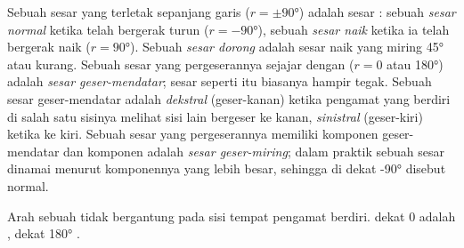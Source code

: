 \begin{definition}\label{def:b1:faults-folds-fabrics:fault-types}
Sebuah sesar yang  terletak sepanjang garis  ($r = \pm\ang{90}$) adalah sesar : sebuah \emph{sesar normal} ketika  telah bergerak turun ($r = \ang{-90}$), sebuah \emph{sesar naik} ketika ia telah bergerak naik ($r = \ang{90}$). Sebuah \emph{sesar dorong} adalah sesar naik yang miring \ang{45} atau kurang. Sebuah sesar yang pergeserannya sejajar dengan  ($r = 0$ atau \ang{180}) adalah \emph{sesar geser-mendatar}; sesar seperti itu biasanya hampir tegak. Sebuah sesar geser-mendatar adalah \emph{dekstral} (geser-kanan) ketika pengamat yang berdiri di salah satu sisinya melihat sisi lain bergeser ke kanan, \emph{sinistral} (geser-kiri) ketika ke kiri. Sebuah sesar yang pergeserannya memiliki komponen geser-mendatar dan komponen  adalah \emph{sesar geser-miring}; dalam praktik sebuah sesar dinamai menurut komponennya yang lebih besar, sehingga  di dekat \ang{-90} disebut normal.
\end{definition}

\begin{proposition}\label{prop:b1:faults-folds-fabrics:sense}
Arah sebuah  tidak bergantung pada sisi tempat pengamat berdiri.  dekat $0$ adalah ,  dekat \ang{180} .
\end{proposition}

